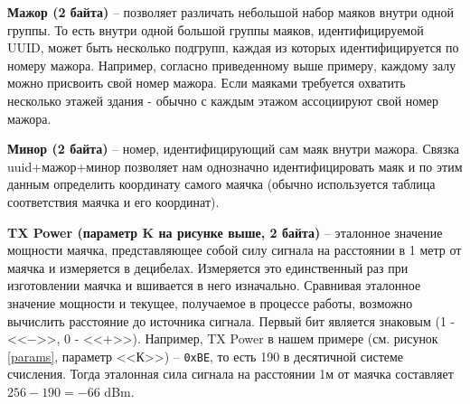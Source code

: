 \textbf{Мажор (2 байта)} – позволяет различать небольшой набор маяков внутри одной группы. То есть внутри одной большой группы маяков, идентифицируемой UUID, может быть несколько подгрупп, каждая из которых идентифицируется по номеру мажора. Например, согласно приведенному выше примеру, каждому залу можно присвоить свой номер мажора. Если маяками требуется охватить несколько этажей здания - обычно с каждым этажом ассоциируют свой номер мажора.

\textbf{Минор (2 байта)} – номер, идентифицирующий сам маяк внутри мажора. Связка uuid+мажор+минор позволяет нам однозначно идентифицировать маяк и по этим данным определить координату самого маячка (обычно используется таблица соответствия маячка и его координат).

\textbf{TX Power (параметр K на рисунке выше, 2 байта)} – эталонное значение мощности маячка, представляющее собой силу сигнала на расстоянии в 1 метр от маячка и измеряется в децибелах. Измеряется это единственный раз при изготовлении маячка и вшивается в него изначально. Сравнивая эталонное значение мощности и текущее, получаемое в процессе работы, возможно вычислить расстояние до источника сигнала. Первый бит является знаковым (1 - <<$-$>>, 0 - <<$+$>>). Например, TX Power в нашем примере (см. рисунок \ref{params}, параметр <<К>>) – \texttt{0xBE}, то есть 190 в десятичной системе счисления. Тогда эталонная сила сигнала на расстоянии 1м от маячка составляет $256-190=-66$ dBm.